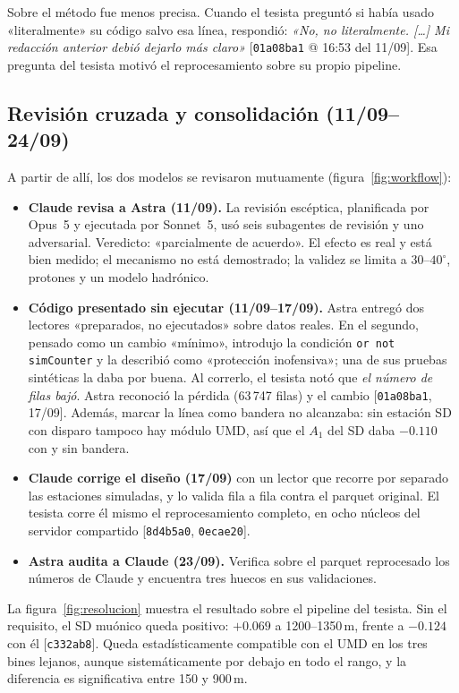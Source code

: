 \documentclass[11pt,a4paper]{article}
\newcommand{\ev}[1]{{\small\color{nota}[#1]}}   %
\newcommand{\code}[1]{\texttt{#1}}
\begin{document}
Sobre el método fue menos precisa. Cuando el tesista preguntó si había usado «literalmente» su código salvo
esa línea, respondió: \emph{«No, no literalmente. [\ldots] Mi redacción anterior debió dejarlo más claro»}
\ev{\code{01a08ba1} @ 16:53 del 11/09}. Esa pregunta del tesista motivó el reprocesamiento sobre su propio
pipeline.

\subsection{Revisión cruzada y consolidación (11/09--24/09)}
A partir de allí, los dos modelos se revisaron mutuamente (figura~\ref{fig:workflow}):
\begin{itemize}
  \item \textbf{Claude revisa a Astra (11/09).} La revisión escéptica, planificada por Opus~5 y ejecutada por
  Sonnet~5, usó seis subagentes de revisión y uno adversarial. Veredicto: «parcialmente de acuerdo». El
  efecto es real y está bien medido; el mecanismo no está demostrado; la validez se limita a
  $30$--$40^\circ$, protones y un modelo hadrónico.
  \item \textbf{Código presentado sin ejecutar (11/09--17/09).} Astra entregó dos lectores «preparados, no
  ejecutados» sobre datos reales. En el segundo, pensado como un cambio «mínimo», introdujo la condición
  \code{or not simCounter} y la describió como «protección inofensiva»; una de sus pruebas sintéticas la
  daba por buena. Al correrlo, el tesista notó que \emph{el número de filas bajó}. Astra reconoció la pérdida
  (63\,747 filas) y el cambio \ev{\code{01a08ba1}, 17/09}. Además, marcar la línea como bandera no
  alcanzaba: sin estación SD con disparo tampoco hay módulo UMD, así que el $A_1$ del SD daba $-0.110$ con y
  sin bandera.
  \item \textbf{Claude corrige el diseño (17/09)} con un lector que recorre por separado las estaciones
  simuladas, y lo valida fila a fila contra el parquet original. El tesista corre él mismo el
  reprocesamiento completo, en ocho núcleos del servidor compartido \ev{\code{8d4b5a0}, \code{0ecae20}}.
  \item \textbf{Astra audita a Claude (23/09).} Verifica sobre el parquet reprocesado los números de Claude y
  encuentra tres huecos en sus validaciones.
\end{itemize}

La figura~\ref{fig:resolucion} muestra el resultado sobre el pipeline del tesista. Sin el requisito, el SD
muónico queda positivo: $+0.069$ a 1200--1350\,m, frente a $-0.124$ con él \ev{\code{c332ab8}}. Queda
estadísticamente compatible con el UMD en los tres bines lejanos, aunque sistemáticamente por debajo en todo
el rango, y la diferencia es significativa entre 150 y 900\,m.
\end{document}
